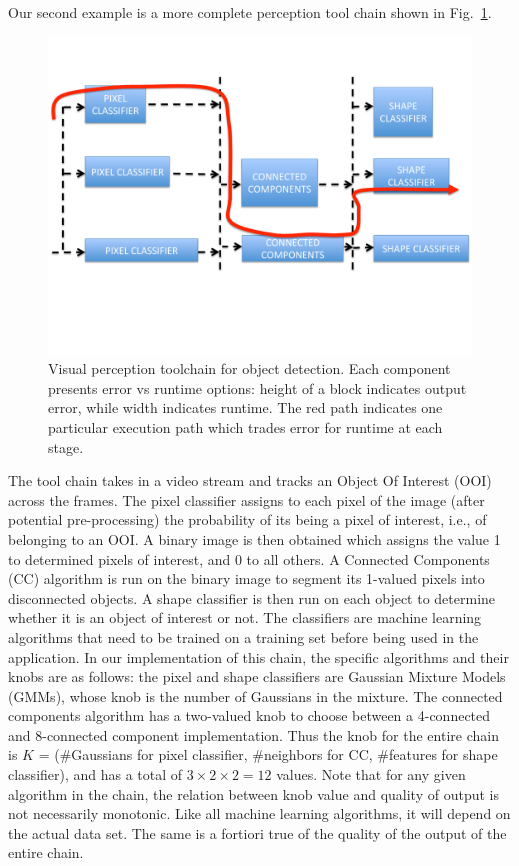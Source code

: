 Our second example is a more complete perception tool chain shown in Fig.~\ref{fig:chain}.
\begin{figure}[t]
	\centering
	\includegraphics[width=0.7\linewidth]{figures/chain}
	\caption{Visual perception toolchain for object detection. Each component presents error vs runtime options: height of a block indicates output error, while width indicates runtime. The red path indicates one particular execution path which trades error for runtime at each stage.}
	\label{fig:chain}
\end{figure}
The tool chain takes in a video stream and tracks an Object Of Interest (OOI) across the frames.
The pixel classifier assigns to each pixel of the image (after potential pre-processing) the probability of its being a pixel of interest, i.e., of belonging to an OOI. 
A binary image is then obtained which assigns the value 1 to determined pixels of interest, and 0 to all others. 
A Connected Components (CC) algorithm is run on the binary image to segment its 1-valued pixels into disconnected objects.
A shape classifier is then run on each object to determine whether it is an object of interest or not.
The classifiers are machine learning algorithms that need to be trained on a training set before being used in the application.
In our implementation of this chain, the specific algorithms and their knobs are as follows:
the pixel and shape classifiers are Gaussian Mixture Models (GMMs), whose knob is the number of Gaussians in the mixture.
The connected components algorithm has a two-valued knob to choose between a 4-connected and 8-connected component implementation.
Thus the knob for the entire chain is $K$ = (\#Gaussians for pixel classifier, \#neighbors for CC, \#features for shape classifier), and has a total of $3 \times 2 \times 2 = 12$ values.
Note that for any given algorithm in the chain, the relation between knob value and quality of output is not necessarily monotonic. 
Like all machine learning algorithms, it will depend on the actual data set.
The same is a fortiori true of the quality of the output of the entire chain.

